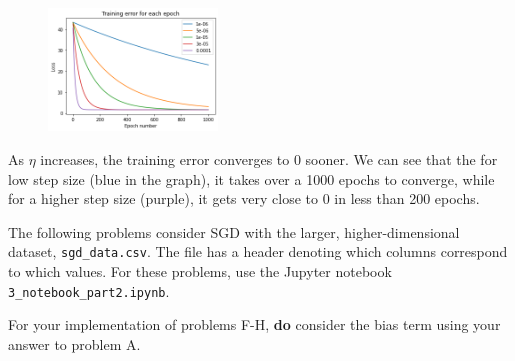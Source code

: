 \begin{solution}

  \begin{figure}[H]
    \centering
    \includegraphics[width=0.4\textwidth]{images/3_1_plot.png}
  \end{figure}
  As $\eta$ increases, the training error converges to 0 sooner. We can see that the for low step size (blue in the graph), it takes over a 1000 epochs to converge, while for a higher step size (purple), it gets very close to 0 in less than 200 epochs.
  
\end{solution}


The following problems consider SGD with the larger, higher-dimensional dataset, \texttt{sgd_data.csv}. The file has a header denoting which columns correspond to which values. For these problems, use the Jupyter notebook \texttt{3_notebook_part2.ipynb}.

For your implementation of problems F-H, \textbf{do} consider the bias term using your answer to problem A.

